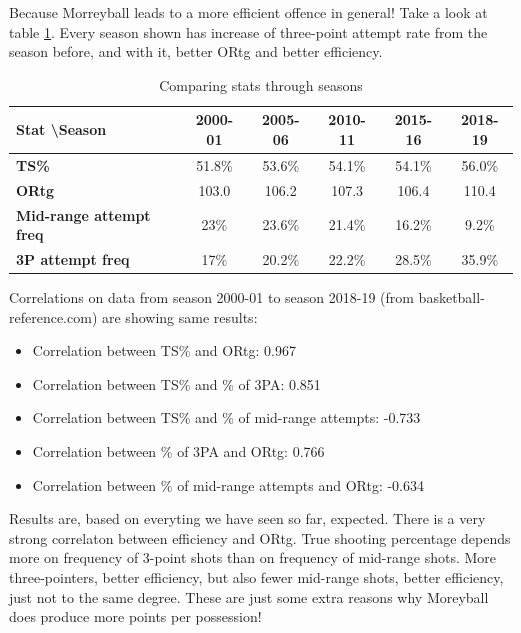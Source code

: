 \documentclass[a4paper]{article}
\begin{document}
Because Morreyball leads to a more efficient offence in general! Take a look at table \ref{tab:seasons_comp}. Every season shown has increase of three-point attempt rate from the season before, and with it, better ORtg and better efficiency.

\begin{table}[h!]
\begin{center}
\begin{tabular}{|l|c|c|c|c|c|} \hline
\textbf{Stat \textbackslash Season} & \textbf{2000-01} & \textbf{2005-06} & \textbf{2010-11} & \textbf{2015-16} & \textbf{2018-19} \\ \hline
\textbf{TS\%} & 51.8\% & 53.6\% & 54.1\% & 54.1\% & 56.0\% \\ \hline
\textbf{ORtg} & 103.0 & 106.2 & 107.3 & 106.4 & 110.4 \\ \hline
\textbf{Mid-range attempt freq} & 23\% & 23.6\% & 21.4\% & 16.2\% & 9.2\% \\ \hline
\textbf{3P attempt freq} & 17\% & 20.2\% & 22.2\% & 28.5\% & 35.9\% \\ \hline
\end{tabular}
\caption{Comparing stats through seasons}
\label{tab:seasons_comp}
\end{center}
\end{table}

Correlations on data from season 2000-01 to season 2018-19 (from basketball-reference.com) are showing same results:

\begin{itemize}
	\item Correlation between TS\% and ORtg: 0.967
	\item Correlation between TS\% and \% of 3PA: 0.851
	\item Correlation between TS\% and \% of mid-range attempts: -0.733
	\item Correlation between \% of 3PA and ORtg: 0.766
	\item Correlation between \% of mid-range attempts and ORtg: -0.634
\end{itemize}

Results are, based on everyting we have seen so far, expected. There is a very strong correlaton between efficiency and ORtg. True shooting percentage depends more on frequency of 3-point shots than on frequency of mid-range shots. More three-pointers, better efficiency, but also fewer mid-range shots, better efficiency, just not to the same degree. These are just some extra reasons why Moreyball does produce more points per possession!
\end{document}
